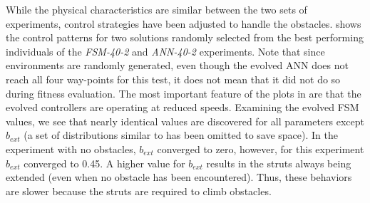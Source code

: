 While the physical characteristics are similar between the two sets of experiments, control strategies have been adjusted to handle the obstacles.
%
 shows the control patterns for two solutions randomly selected from the best performing individuals of the \emph{FSM-40-2} and \emph{ANN-40-2} experiments.
%
Note that since environments are randomly generated, even though the evolved ANN does not reach all four way-points for this test, it does not mean that it did not do so during fitness evaluation.
%
The most important feature of the plots in  are that the evolved controllers are operating at reduced speeds.
%
%
Examining the evolved FSM values, we see that nearly identical values are discovered for all parameters except $b_{\mathit{ext}}$
(a set of distributions similar to  has been omitted to save space).
%
In the experiment with no obstacles, $b_{\mathit{ext}}$ converged to zero, however, for this experiment $b_{\mathit{ext}}$ converged to 0.45.
%
A higher value for $b_{\mathit{ext}}$ results in the struts always being extended (even when no obstacle has been encountered).
%
Thus, these behaviors are slower because the struts are required to climb obstacles.

%




